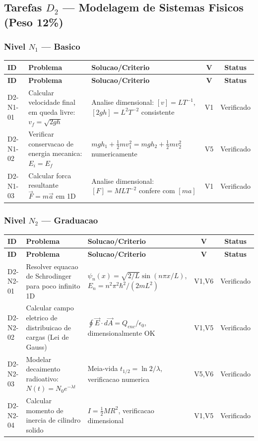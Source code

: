 \subsection{Tarefas $D_2$ --- Modelagem de Sistemas Fisicos (Peso 12\%)}

\subsubsection{Nivel $N_1$ --- Basico}

\begin{longtable}{|p{2.0cm}|p{4.2cm}|p{4.2cm}|c|c|}
\hline
\textbf{ID} & \textbf{Problema} & \textbf{Solucao/Criterio} & \textbf{V} & \textbf{Status} \\
\hline
\endfirsthead
\hline
\textbf{ID} & \textbf{Problema} & \textbf{Solucao/Criterio} & \textbf{V} & \textbf{Status} \\
\hline
\endhead
\hline
\endfoot
D2-N1-01 & Calcular velocidade final em queda livre: $v_{f}=\sqrt{2gh}$ & Analise dimensional: $[v]=LT^{-1}$, $[2gh]=L^{2}T^{-2}$ consistente & V1 & Verificado \\
\hline
D2-N1-02 & Verificar conservacao de energia mecanica: $E_{i}=E_{f}$ & $mgh_{1}+\frac{1}{2}mv_{1}^{2}=mgh_{2}+\frac{1}{2}mv_{2}^{2}$ numericamente & V5 & Verificado \\
\hline
D2-N1-03 & Calcular forca resultante $\vec{F}=m\vec{a}$ em 1D & Analise dimensional: $[F]=MLT^{-2}$ confere com $[ma]$ & V1 & Verificado \\
\hline
\end{longtable}

\subsubsection{Nivel $N_2$ --- Graduacao}

\begin{longtable}{|p{2.0cm}|p{4.2cm}|p{4.2cm}|c|c|}
\hline
\textbf{ID} & \textbf{Problema} & \textbf{Solucao/Criterio} & \textbf{V} & \textbf{Status} \\
\hline
\endfirsthead
\hline
\textbf{ID} & \textbf{Problema} & \textbf{Solucao/Criterio} & \textbf{V} & \textbf{Status} \\
\hline
\endhead
\hline
\endfoot
D2-N2-01 & Resolver equacao de Schrodinger para poco infinito 1D & $\psi_{n}(x)=\sqrt{2/L}\sin(n\pi x/L)$, $E_{n}=n^{2}\pi^{2}\hbar^{2}/(2mL^{2})$ & V1,V6 & Verificado \\
\hline
D2-N2-02 & Calcular campo eletrico de distribuicao de cargas (Lei de Gauss) & $\oint\vec{E}\cdot d\vec{A}=Q_{enc}/\epsilon_{0}$, dimensionalmente OK & V1,V5 & Verificado \\
\hline
D2-N2-03 & Modelar decaimento radioativo: $N(t)=N_{0}e^{-\lambda t}$ & Meia-vida $t_{1/2}=\ln 2/\lambda$, verificacao numerica & V5,V6 & Verificado \\
\hline
D2-N2-04 & Calcular momento de inercia de cilindro solido & $I=\frac{1}{2}MR^{2}$, verificacao dimensional & V1,V5 & Verificado \\
\hline
\end{longtable}

